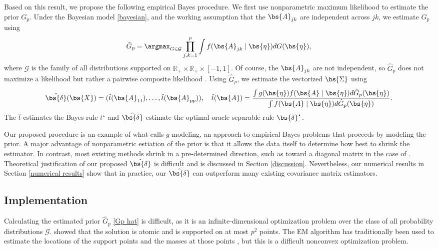 Based on this result, we propose the following empirical Bayes procedure. We first use nonparametric maximum likelihood \citep{kiefer1956consistency} to estimate the prior $G_p$. Under the Bayesian model \eqref{bayesian}, and the working assumption that the $\bs{A}_{jk}$ are independent across $jk$, we estimate $G_p$ using
\begin{equation}
  \label{Gp hat}
  \hat{G}_p = \argmax_{G \in \mathcal{G}} \prod_{j,k = 1}^p \int f(\bs{A}_{jk} \mid \bs{\eta}) dG(\bs{\eta}),
\end{equation}
where $\mathcal{G}$ is the family of all distributions supported on $\mathbb{R}_+ \times \mathbb{R}_+ \times [-1, 1]$. Of course, the $\bs{A}_{jk}$ are not independent, so $\hat{G}_p$ does not maximize a likelihood but rather a pairwise composite likelihood \citep{varin2011overview}. Using $\hat{G}_p$, we estimate the vectorized $\bs{\Sigma}$ using
\begin{equation}
  \label{proposed}
  \hat{\bs{\delta}}(\bs{X})
  =
  (\hat{t}(\bs{A}_{11}), \ldots, \hat{t}(\bs{A}_{pp})),
  \quad
  \hat{t}(\bs{A}) = \frac{\int g(\bs{\eta}) f(\bs{A} \mid \bs{\eta})d\hat{G}_p(\bs{\eta})}{\int f(\bs{A} \mid \bs{\eta}) d\hat{G}_p(\bs{\eta})}.
\end{equation}
The $\hat{t}$ estimates the Bayes rule $t^\star$ and $\hat{\bs{\delta}}$ estimate the optimal oracle separable rule $\bs{\delta}^\star$.

Our proposed procedure is an example of what \citet{efron2014two} calls $g$-modeling, an approach to empirical Bayes problems that proceeds by modeling the prior. A major advantage of nonparametric estiation of the prior is that it allows the data itself to determine how best to shrink the estimator. In contrast, most existing methods shrink in a pre-determined direction, such as toward a diagonal matrix in the case of \citet{ledoit2004well}. Theoretical justification of our proposed $\hat{\bs{\delta}}$ is difficult and is discussed in Section \ref{discussion}. Nevertheless, our numerical results in Section \ref{numerical results} show that in practice, our $\hat{\bs{\delta}}$ can outperform many existing covariance matrix estimators.

\subsection{\label{implementation}Implementation}

Calculating the estimated prior $\hat{G}_p$ \eqref{Gp hat} is difficult, as it is an infinite-dimensional optimization problem over the class of all probability distributions $\mathcal{G}$. \citet{lindsay1983geometry} showed that the solution is atomic and is supported on at most $p^2$ points. The EM algorithm has traditionally been used to estimate the locations of the support points and the masses at those points \citep{laird1978nonparametric}, but this is a difficult nonconvex optimization problem.

